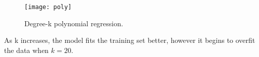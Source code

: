 \begin{answer}
\begin{figure}[H]
	\centering
	\texttt{[image: poly]}
	\caption{Degree-k polynomial regression.}
\end{figure}
As k increases, the model fits the training set better, however it begins to overfit the data when $k = 20$. \\
\end{answer}
